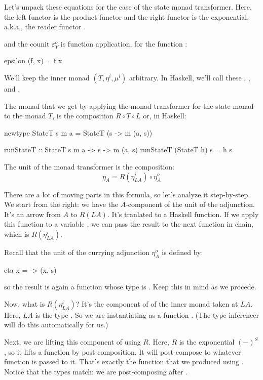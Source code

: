 \documentclass[DaoFP]{subfiles}
\begin{document}
Let's unpack these equations for the case of the state monad transformer. Here, the left functor is the product functor  and the right functor is the exponential, a.k.a., the reader functor . 

and the counit $\varepsilon^o_Y$ is function application, for the function :
\begin{haskell}
epsilon (f, x) = f x
\end{haskell}
We'll keep the inner monad $(T, \eta^i, \mu^i)$ arbitrary. In Haskell, we'll call these , , and .

The monad that we get by applying the monad transformer for the state monad to the monad $T$, is the composition $R \circ T \circ L$ or, in Haskell:
\begin{haskell}
newtype StateT s m a = StateT (s -> m (a, s))
\end{haskell}

\begin{haskell}
runStateT :: StateT s m a -> s -> m (a, s)
runStateT (StateT h) s = h s
\end{haskell}

The unit of the monad transformer is the composition:
\[ \eta_A = R(\eta^i_{L A}) \circ \eta^o_A \]

There are a lot of moving parts in this formula, so let's analyze it step-by-step. We start from the right: we have the $A$-component of the unit of the adjunction. It's an arrow from $A$ to $R (L A)$. It's tranlated to a Haskell function. If we apply this function to a variable , we can pass the result to the next function in chain, which is $R(\eta^i_{L A})$.

Recall that the unit of the currying adjunction $\eta^o_A$ is defined by:
\begin{haskell}
eta x = \s -> (x, s)
\end{haskell}
so the result is again a function whose type is . Keep this in mind as we procede. 

Now, what is $R(\eta^i_{LA})$? It's the component of  of the inner monad taken at $L A$. Here, $L A$ is the type . So we are instantiating  as a function . (The type inferencer will do this automatically for us.)

Next, we are lifting this component of  using $R$. Here, $R$ is the exponential $(-)^S$, so it lifts a function by post-composition. It will post-compose  to whatever function is passed to it. That's exactly the function that we produced using . Notice that the types match: we are post-composing  after . 
\end{document}
